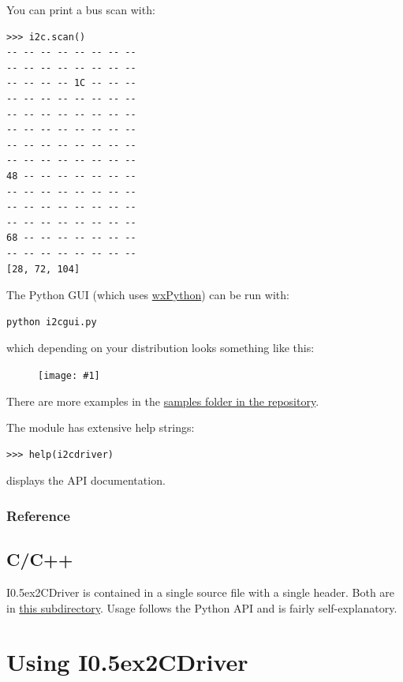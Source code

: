 \documentclass{article}
\newcommand{\two}{\raise0.5ex\hbox{\footnotesize{2}}}
\newcommand{\iicdriver}{I\two{}CDriver}
\newcommand{\png}[1]{
\begin{figure}[H]
\begin{center}
\texttt{[image: \#1]}
\end{center}
\end{figure}
}
\begin{document}
You can print a bus scan with:

\begin{lstlisting}
>>> i2c.scan()
-- -- -- -- -- -- -- -- 
-- -- -- -- -- -- -- -- 
-- -- -- -- 1C -- -- -- 
-- -- -- -- -- -- -- -- 
-- -- -- -- -- -- -- -- 
-- -- -- -- -- -- -- -- 
-- -- -- -- -- -- -- -- 
-- -- -- -- -- -- -- -- 
48 -- -- -- -- -- -- -- 
-- -- -- -- -- -- -- -- 
-- -- -- -- -- -- -- -- 
-- -- -- -- -- -- -- -- 
68 -- -- -- -- -- -- -- 
-- -- -- -- -- -- -- -- 
[28, 72, 104]
\end{lstlisting}

The Python GUI (which uses \href{https://www.wxpython.org/pages/downloads/}{wxPython}) can be run with:

\begin{lstlisting}
python i2cgui.py
\end{lstlisting}

which depending on your distribution looks something like this:

\png{img/i2cdriver/win32-gui}

There are more examples in the 
\href{https://github.com/jamesbowman/i2cdriver/tree/master/python/samples}{samples folder in the repository}.

The module has extensive help strings:
\begin{lstlisting}
>>> help(i2cdriver)
\end{lstlisting}
displays the API documentation.

\newpage
\subsubsection{Reference}
\let\spxentry \sphinxstyleindexentry
\let\spxextra \sphinxstyleindexextra



\subsection{C/C++}

\iicdriver{} is contained in a single source file with a single header.
Both are in \href{https://github.com/jamesbowman/i2cdriver/tree/master/c/common}{this subdirectory}.
Usage follows the Python API and is fairly self-explanatory.

\newpage
\section{Using \iicdriver{}}
\end{document}
